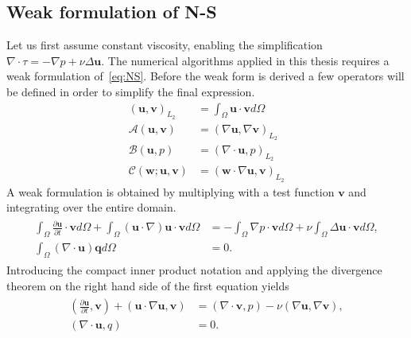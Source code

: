 \subsection{Weak formulation of N-S}
Let us first assume constant viscosity, enabling the simplification $\nabla \cdot \tau = -\nabla p + \nu \Delta \mathbf{u}$.
The numerical algorithms applied in this thesis requires a weak formulation of~\ref{eq:NS}.
Before the weak form is derived a few operators will be defined in order to simplify the final 
expression.
%
\begin{align}
    ( \mathbf{u},\mathbf{v})_{L_2} &= \int_{\Omega}\mathbf{u} \cdot \mathbf{v} d\Omega\\
    \mathcal{A}(\mathbf{u},\mathbf{v}) &= (\nabla \mathbf{u},\nabla \mathbf{v})_{L_2}\\
    \mathcal{B}(\mathbf{u},p) &= (\nabla \cdot \mathbf{u},p)_{L_2}\\
    \mathcal{C}(\mathbf{w};\mathbf{u},\mathbf{v}) &= (\mathbf{w}\cdot \nabla \mathbf{u},\mathbf{v})_{L_2}
    \label{eq:weakoperators}
\end{align}
%
A weak formulation is obtained by multiplying with a test function $\mathbf{v}$ and integrating over
the entire domain.
\begin{align}
    \begin{split}
        \int_{\Omega}\frac{\partial \mathbf{u}}{\partial t}\cdot\mathbf{v}d\Omega
        + \int_{\Omega}(\mathbf{u}\cdot \nabla)\mathbf{u}\cdot\mathbf{v}d\Omega
        &= -\int_{\Omega}\nabla p\cdot \mathbf{v} d\Omega 
        + \nu \int_{\Omega}\Delta\mathbf{u}\cdot\mathbf{v}d\Omega, \\
		\int_{\Omega}(\nabla \cdot \mathbf{u}) \mathbf{q}d\Omega &= 0.
    \end{split}
	\label{eq:NSweak1}
\end{align}
Introducing the compact inner product notation and applying the divergence theorem on the right hand side of 
the first equation yields
\begin{align}
    \begin{split}
        (\frac{\partial \mathbf{u}}{\partial t},\mathbf{v})
        + (\mathbf{u}\cdot \nabla\mathbf{u},\mathbf{v})
        &= (\nabla \cdot \mathbf{v} , p ) 
        -\nu(\nabla \mathbf{u},\nabla \mathbf{v}), \\
		(\nabla \cdot \mathbf{u},q) &= 0.
    \end{split}
	\label{eq:NSweak}
\end{align}
